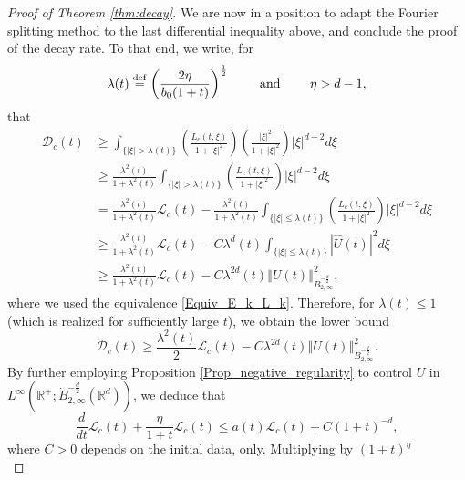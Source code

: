 \documentclass[11pt, leqno, a4paper,]{amsart}
\theoremstyle{remark}
\numberwithin{equation}{section}
\newcommand*{\bydef}{\overset{\rm def}{=}}
\newcommand*{\norm}[1]{\left\Vert #1\right\Vert}
\begin{document}
\begin{proof}[Proof of Theorem \ref{thm:decay}]
We are now in a position to adapt the Fourier splitting method to the last differential inequality above, and conclude the proof of the decay rate. To that end, we write, for 
\begin{equation*}
	\lambda (t) \bydef \left( \frac{2\eta }{b_0 (1+t)} \right)^\frac{1}{2} \qquad \text{ and } \qquad \eta >d-1,
\end{equation*}
that
\begin{equation*}
	\begin{aligned}
		\mathcal{D}_c (t)
		 &\geq    \int_{\{  |\xi| >\lambda (t) \}} \left ( \frac{L_c(t,\xi)}{ 1+ |\xi|^2 } \right) \left( 
		 \frac{|\xi|^2}{1+|\xi|^2} \right) |\xi|^{d-2}d\xi
		 \\
		&\geq    \frac{ \lambda^2(t) }{1+  \lambda^2(t) } \int_{\{  |\xi| >\lambda (t) \}} \left ( \frac{L_c(t,\xi)}{ 1+ |\xi|^2 } \right) |\xi|^{d-2}d\xi
		\\
		&=       \frac{ \lambda^2(t) }{1+  \lambda^2(t) } \mathcal{L}_c(t)-   \frac{ \lambda^2(t) }{1+  \lambda^2(t) }  \int_{\{  |\xi| \leq \lambda (t) \}} \left ( \frac{L_c(t,\xi)}{ 1+ |\xi|^2 } \right) |\xi|^{d-2}d\xi
		\\
		&\geq        \frac{ \lambda^2(t) }{1+  \lambda^2(t) }  \mathcal{L}_c(t)- C    \lambda^ { d}(t)    \int_{\{  |\xi| \leq \lambda (t) \}} |\widehat U(t)|^2d\xi
		\\
		&\geq       \frac{ \lambda^2(t) }{1+  \lambda^2(t) }  \mathcal{L}_c(t)-  C   \lambda^ { 2d}(t)   \norm { U(t)}_{\dot B_{2,\infty}^{-\frac{d}{2}}}^2,
	\end{aligned}
\end{equation*}
where we used the equivalence \eqref{Equiv_E_k_L_k}.
Therefore, for $\lambda(t)\leq   1$ (which is realized for sufficiently large $t$),
we obtain the lower bound
\begin{equation*}
	\mathcal D_c(t) \geq \frac{\lambda ^2(t)}{2} \mathcal L_c(t) - C   \lambda^ { 2d}(t)   \norm { U(t)}_{\dot B_{2,\infty}^{-\frac{d}{2}}}^2.
\end{equation*}
 By further employing Proposition \ref{Prop_negative_regularity} to control  $U$ in $L^\infty(\mathbb R^+; \dot B^{-\frac{d}{2}}_{2,\infty}(\mathbb R^d))$, we deduce that 
\begin{equation*}
	\frac{d}{dt} \mathcal{L}_c(t) + \frac{\eta }{ 1+t} \mathcal{L}_c(t) \leq a(t)  \mathcal{L}_c(t)  +C \left( 1+t \right) ^ {  -d  } ,
\end{equation*}
where $C>0$ depends on the initial data, only.
Multiplying by $(1+t)^\eta$   
\begin{equation*}

\end{equation*}
\end{proof}
\end{document}
